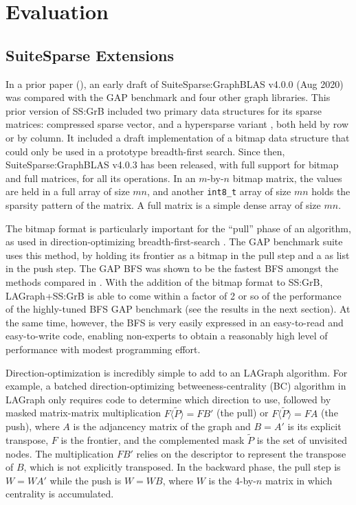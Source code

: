 \section{Evaluation}
\label{sec:evaluation}


\subsection{SuiteSparse Extensions}

In a prior paper (\cite{DBLP:conf/ppsc/ZhangAH20}), an early draft of
SuiteSparse:GraphBLAS v4.0.0 (Aug 2020) was compared with the GAP benchmark
\cite{DBLP:conf/sc/BeamerAP12} and four other graph libraries.  This prior
version of SS:GrB included two primary data structures for its sparse matrices:
compressed sparse vector, and a hypersparse variant
\cite{DBLP:conf/ipps/BulucG08}, both held by row or by column.  It included a
draft implementation of a bitmap data structure that could only be used in a
prototype breadth-first search.  Since then, SuiteSparse:GraphBLAS v4.0.3 has
been released, with full support for bitmap and full matrices, for all its
operations.  In an $m$-by-$n$ bitmap matrix, the values are held in a full
array of size $mn$, and another \verb'int8_t' array of size $mn$ holds the
sparsity pattern of the matrix.  A full matrix is a simple dense array of size
$mn$.

The bitmap format is particularly important for the ``pull'' phase of an
algorithm, as used in direction-optimizing breadth-first-search
\cite{DBLP:conf/sc/BeamerAP12}.  The GAP benchmark suite uses this method, by
holding its frontier as a bitmap in the pull step and a as list in the push
step. The GAP BFS was shown to be the fastest BFS amongst the methods compared
in \cite{DBLP:conf/sc/BeamerAP12}.  With the addition of the bitmap format to
SS:GrB, LAGraph+SS:GrB is able to come within a factor of 2 or so of the
performance of the highly-tuned BFS GAP benchmark (see the results in the next
section).  At the same time, however, the BFS is very easily expressed in an
easy-to-read and easy-to-write code, enabling non-experts to obtain a
reasonably high level of performance with modest programming effort.


Direction-optimization is incredibly simple to add to an LAGraph algorithm.
For example, a batched direction-optimizing betweeness-centrality (BC)
algorithm in LAGraph only requires code to determine which direction to use,
followed by masked matrix-matrix multiplication $F \langle \tilde P \rangle
=FB'$ (the pull) or $F \langle \tilde P \rangle =FA$ (the push), where $A$ is
the adjancency matrix of the graph and $B=A'$ is its explicit transpose, $F$ is
the frontier, and the complemented mask $\tilde P$ is the set of unvisited
nodes.  The multiplication $FB'$ relies on the descriptor to represent the
transpose of $B$, which is not explicitly transposed.  In the backward phase,
the pull step is $W=WA'$ while the push is $W=WB$, where $W$ is the 4-by-$n$
matrix in which centrality is accumulated.

